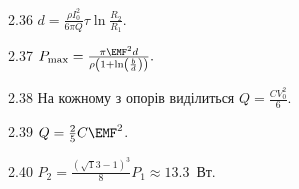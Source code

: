 \begin{Solution}{2.{36}}
	$d = \frac{\rho I_0^2}{6\pi Q} \tau \ln\frac{R_2}{R_1}$.
\end{Solution}
\begin{Solution}{2.{37}}
	$P_{\max} = \frac{\pi\EMF^2 d}{\rho \left( 1 + \ln\left( \frac{b}{d}\right)  \right) }.$
\end{Solution}
\begin{Solution}{2.{38}}
	На кожному з опорів виділиться $Q = \frac{CV_0^2}{6}$.
\end{Solution}
\begin{Solution}{2.{39}}
	$Q = \frac25 C\EMF^2$.
\end{Solution}
\begin{Solution}{2.{40}}
	$P_2 = \frac{(\sqrt13 - 1)^3}{8}P_1 \approx 13.3$~Вт.
\end{Solution}
